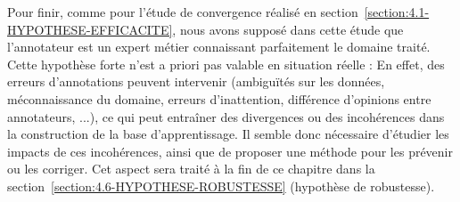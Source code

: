 			Pour finir, comme pour l'étude de convergence réalisé en section~\ref{section:4.1-HYPOTHESE-EFFICACITE}, nous avons supposé dans cette étude que l'annotateur est un expert métier connaissant parfaitement le domaine traité.
			Cette hypothèse forte n'est a priori pas valable en situation réelle : En effet, des erreurs d'annotations peuvent intervenir (ambiguïtés sur les données, méconnaissance du domaine, erreurs d'inattention, différence d'opinions entre annotateurs, ...), ce qui peut entraîner des divergences ou des incohérences dans la construction de la base d'apprentissage.
			Il semble donc nécessaire d'étudier les impacts de ces incohérences, ainsi que de proposer une méthode pour les prévenir ou les corriger.
			Cet aspect sera traité à la fin de ce chapitre dans la section~\ref{section:4.6-HYPOTHESE-ROBUSTESSE} (hypothèse de robustesse).